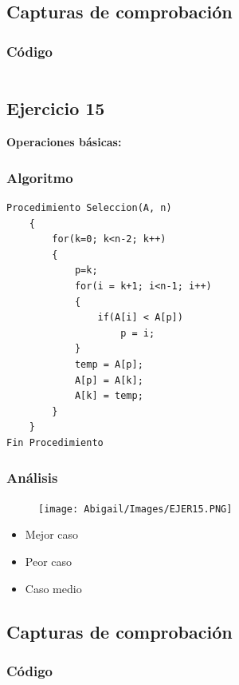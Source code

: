 \documentclass[12pt]{article}
\begin{document}
	        \subsection{Capturas de comprobación}

	        \subsubsection{Código}
	            \begin{lstlisting}[style=Java]
    		    \end{lstlisting}

	    \subsection{Ejercicio 15}
	   	\textbf{Operaciones básicas:}
		
			\subsubsection{Algoritmo}
			    \begin{lstlisting}[style=Java]
Procedimiento Seleccion(A, n)
	{
		for(k=0; k<n-2; k++)
		{
			p=k;
			for(i = k+1; i<n-1; i++)
			{
				if(A[i] < A[p])
					p = i;
			}
			temp = A[p];
			A[p] = A[k];
			A[k] = temp;
		}
	}
Fin Procedimiento
    		    \end{lstlisting}

	        \subsubsection{Análisis}

		        \begin{figure}[h!]
	                \centering
	                \texttt{[image: Abigail/Images/EJER15.PNG]}
	 		    \end{figure} 
	    		\begin{itemize}
	    			\item[\Checklist] Mejor caso \\

	    			\item[\Checklist] Peor caso \\
					
					\item[\Checklist] Caso medio \\

				\end{itemize}

	        \subsection{Capturas de comprobación}

	        \subsubsection{Código}
	            \begin{lstlisting}[style=Java]
    		    \end{lstlisting}
\end{document}
